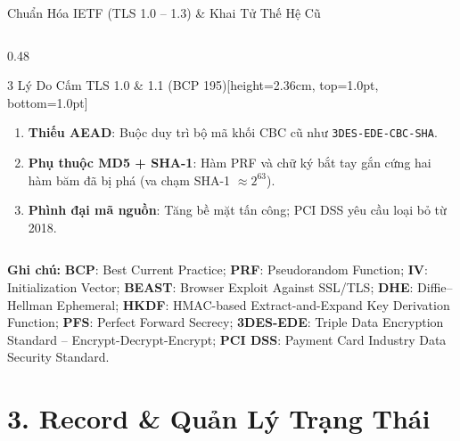 \documentclass[aspectratio=169, 10pt]{beamer}
\newcommand{\abbrbar}[1]{%
	\par\vspace{0.06cm}%
	\begin{uetcard}[colback=uetlightgray, colframe=uetborder, boxrule=0.5pt, sharp corners, arc=0pt, left=5pt, right=5pt, top=1.6pt, bottom=1.6pt, boxsep=0.4pt, before skip=0pt, after skip=0pt, no shadow]
		\raggedright\fontsize{5.35pt}{6.55pt}\selectfont\color{uetdark}%
		{\color{uetblue}\textbf{Ghi chú:}} #1%
	\end{uetcard}%
}
\begin{document}
\begin{frame}{Chuẩn Hóa IETF (TLS 1.0 -- 1.3) \& Khai Tử Thế Hệ Cũ}
\begin{columns}[T]
		\begin{column}{0.48\textwidth}
			\begin{accentcard}[uetblue]{3 Lý Do Cấm TLS 1.0 \& 1.1 (BCP 195)}[height=2.36cm, top=1.0pt, bottom=1.0pt]
				\begin{enumerate}\setlength{\itemsep}{0.4pt}\setlength{\topsep}{0pt}\setlength{\parsep}{0pt}\fontsize{5.85pt}{6.95pt}\selectfont
					\item \textbf{Thiếu AEAD}: Buộc duy trì bộ mã khối CBC cũ như \texttt{3DES-EDE-CBC-SHA}.
					\item \textbf{Phụ thuộc MD5 + SHA-1}: Hàm PRF và chữ ký bắt tay gắn cứng hai hàm băm đã bị phá (va chạm SHA-1 $\approx 2^{63}$).
					\item \textbf{Phình đại mã nguồn}: Tăng bề mặt tấn công; PCI DSS yêu cầu loại bỏ từ 2018.
				\end{enumerate}
			\end{accentcard}
		\end{column}
	\end{columns}
	\abbrbar{\textbf{BCP}: Best Current Practice; \textbf{PRF}: Pseudorandom Function; \textbf{IV}: Initialization Vector; \textbf{BEAST}: Browser Exploit Against SSL/TLS; \textbf{DHE}: Diffie--Hellman Ephemeral; \textbf{HKDF}: HMAC-based Extract-and-Expand Key Derivation Function; \textbf{PFS}: Perfect Forward Secrecy; \textbf{3DES-EDE}: Triple Data Encryption Standard -- Encrypt-Decrypt-Encrypt; \textbf{PCI DSS}: Payment Card Industry Data Security Standard.}
\end{frame}

\section{3. Record \& Quản Lý Trạng Thái}
\end{document}
